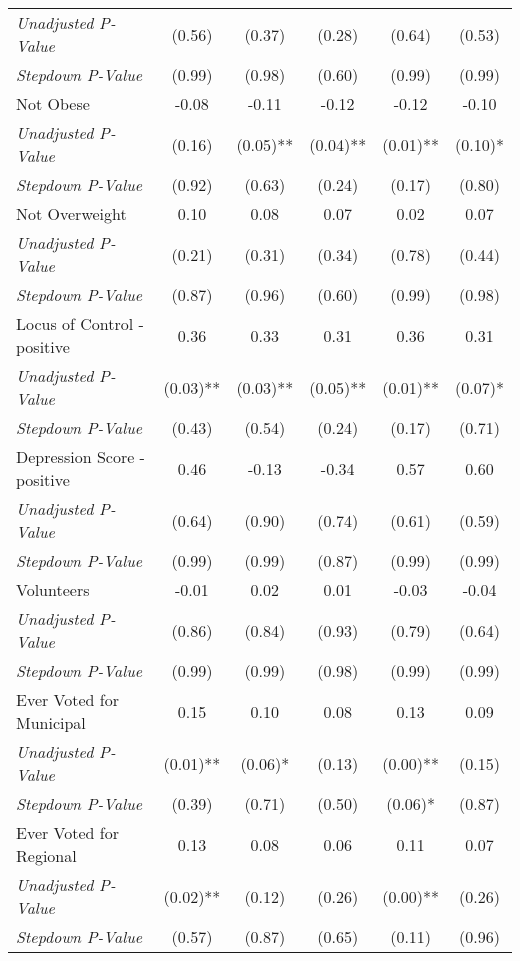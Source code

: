 \begin{tabular}{l c c c c c}
\quad \textit{Unadjusted P-Value} & (0.56) & (0.37) & (0.28) & (0.64) & (0.53) \\
\quad \textit{Stepdown P-Value} & (0.99) & (0.98) & (0.60) & (0.99) & (0.99) \\
Not Obese & -0.08 & -0.11 & -0.12 & -0.12 & -0.10 \\
\quad \textit{Unadjusted P-Value} & (0.16) & (0.05)** & (0.04)** & (0.01)** & (0.10)* \\
\quad \textit{Stepdown P-Value} & (0.92) & (0.63) & (0.24) & (0.17) & (0.80) \\
Not Overweight & 0.10 & 0.08 & 0.07 & 0.02 & 0.07 \\
\quad \textit{Unadjusted P-Value} & (0.21) & (0.31) & (0.34) & (0.78) & (0.44) \\
\quad \textit{Stepdown P-Value} & (0.87) & (0.96) & (0.60) & (0.99) & (0.98) \\
Locus of Control - positive & 0.36 & 0.33 & 0.31 & 0.36 & 0.31 \\
\quad \textit{Unadjusted P-Value} & (0.03)** & (0.03)** & (0.05)** & (0.01)** & (0.07)* \\
\quad \textit{Stepdown P-Value} & (0.43) & (0.54) & (0.24) & (0.17) & (0.71) \\
Depression Score - positive & 0.46 & -0.13 & -0.34 & 0.57 & 0.60 \\
\quad \textit{Unadjusted P-Value} & (0.64) & (0.90) & (0.74) & (0.61) & (0.59) \\
\quad \textit{Stepdown P-Value} & (0.99) & (0.99) & (0.87) & (0.99) & (0.99) \\
Volunteers & -0.01 & 0.02 & 0.01 & -0.03 & -0.04 \\
\quad \textit{Unadjusted P-Value} & (0.86) & (0.84) & (0.93) & (0.79) & (0.64) \\
\quad \textit{Stepdown P-Value} & (0.99) & (0.99) & (0.98) & (0.99) & (0.99) \\
Ever Voted for Municipal & 0.15 & 0.10 & 0.08 & 0.13 & 0.09 \\
\quad \textit{Unadjusted P-Value} & (0.01)** & (0.06)* & (0.13) & (0.00)** & (0.15) \\
\quad \textit{Stepdown P-Value} & (0.39) & (0.71) & (0.50) & (0.06)* & (0.87) \\
Ever Voted for Regional & 0.13 & 0.08 & 0.06 & 0.11 & 0.07 \\
\quad \textit{Unadjusted P-Value} & (0.02)** & (0.12) & (0.26) & (0.00)** & (0.26) \\
\quad \textit{Stepdown P-Value} & (0.57) & (0.87) & (0.65) & (0.11) & (0.96) \\

\end{tabular}
